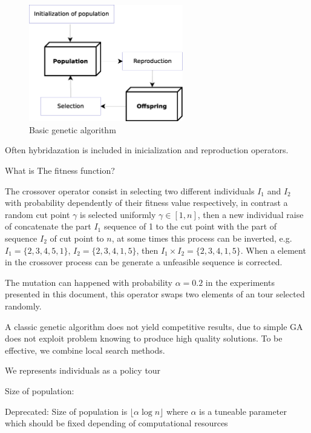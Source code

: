 \begin{figure}[!htbp]
  \begin{center}
   \includegraphics[width=0.6\textwidth]{Images/Chapter3/ga_basic.eps}
  \end{center}
    \caption{Basic genetic algorithm}\label{fig:ga_basic}
\end{figure}

Often hybridazation is included in inicialization and reproduction operators.

What is The fitness function? %

The crossover operator consist in selecting two different individuals $I_1$ and $I_2$ with probability dependently of their fitness value respectively, in contrast a random cut point $\gamma$ is selected uniformly $\gamma \in [1,n]$, then a new individual raise of concatenate the part $I_1$ sequence of 1 to the cut point with the part of sequence $I_2$ of cut point to $n$, at some times this process can be inverted, e.g. $I_1 = \{2, 3, 4, 5, 1\}$, $I_2= \{2, 3, 4, 1, 5\}$, then $I_1\times I_2 = \{2, 3, 4, 1, 5\}$. When a element in the crossover process can be generate a unfeasible sequence is corrected.

The mutation can happened with probability $\alpha = 0.2$ in the experiments presented in this document, this operator swaps two elements of an tour selected randomly.


A classic genetic algorithm does not yield competitive results, due to simple GA does not exploit problem knowing to produce high quality solutions. To be effective, we combine local search methods.


We represents individuals as a policy tour


Size of population:

Deprecated:
Size of population is $\lfloor \alpha \log n \rfloor$ where $\alpha$ is a tuneable parameter which should be fixed depending of computational resources 


